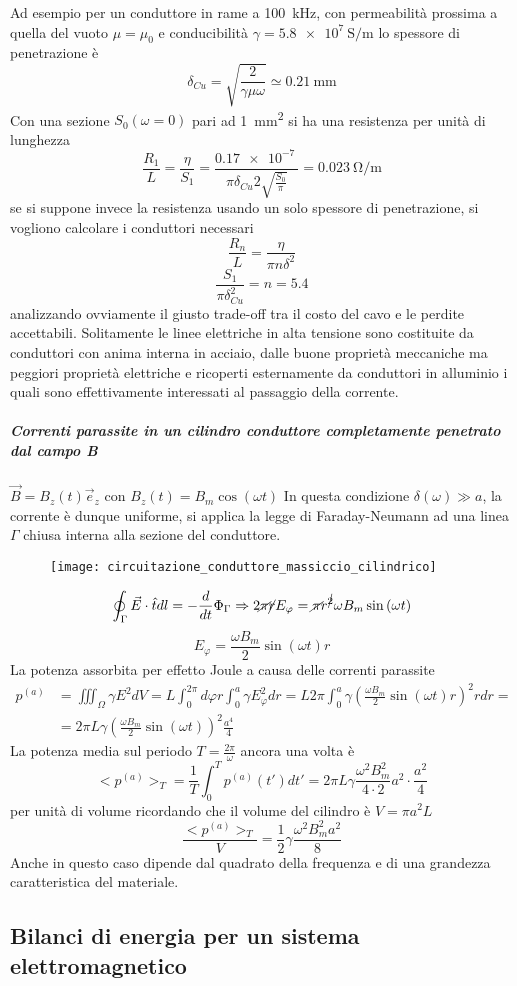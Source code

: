 Ad esempio per un conduttore in rame a \SI{100}{\kilo\hertz}, con permeabilità prossima a quella del vuoto
$\mu = \mu_0 $ e conducibilità $\gamma= \SI{5.8e7}{\siemens\per\meter}$ lo spessore di penetrazione è
$$
\delta_{Cu} = \sqrt{\frac{2}{\gamma\mu\omega}} \simeq \SI{0.21}{\milli\meter}
$$
Con una sezione $S_0(\omega = 0)$ pari ad \SI{1}{\milli\meter^2} si ha una resistenza per unità di lunghezza
$$
\frac{R_1}{L} = \frac{\eta}{S_1} = \frac{\SI{0.17e-7}{}}{\pi\delta_{Cu} 2\sqrt{\frac{S_0}{\pi}}} = \SI{0.023}{\ohm\per\meter}
$$
se si suppone invece la resistenza usando un solo spessore di penetrazione, si vogliono calcolare i conduttori
necessari
$$
\frac{R_n}{L} = \frac{\eta}{\pi n\delta^2}
$$
$$
\frac{S_1}{\pi\delta_{Cu}^2} = n = 5.4
$$
analizzando ovviamente il giusto trade-off tra il costo del cavo e le perdite accettabili. Solitamente le linee 
elettriche in alta tensione sono costituite da conduttori con anima interna in acciaio, dalle buone proprietà
meccaniche ma peggiori proprietà elettriche e ricoperti esternamente da conduttori in alluminio i quali sono
effettivamente interessati al passaggio della corrente.

\subparagraph{Correnti parassite in un cilindro conduttore completamente penetrato dal campo B} $\vec{B} = B_z(t)\vec{e}_z$ con $B_z(t) = B_m\cos\left(\omega t\right)$
In questa condizione $\delta(\omega)\gg a$, la corrente è dunque uniforme, si applica la legge di Faraday-Neumann
ad una linea $\Gamma$ chiusa interna alla sezione del conduttore.
\begin{figure}[H]
\centering
\texttt{[image: circuitazione\_conduttore\_massiccio\_cilindrico]}
\end{figure}
$$
\oint_\Gamma \vec{E}\cdot\hat{t}dl = - \frac{d}{dt}\Phi_\Gamma \Rightarrow 2\cancel{\pi} \cancel{r} E_\varphi = \cancel{\pi} r^{\cancel{2}} \omega B_m\sin\left(\omega t\right)
$$
$$
E_\varphi = \frac{\omega B_m}{2}\sin\left(\omega t\right)r
$$
La potenza assorbita per effetto Joule a causa delle correnti parassite
$$\begin{aligned}
p^{(a)} &= \iiint_\Omega \gamma E^2 dV = L\int_0^{2\pi}d\varphi r \int_0^a\gamma E^2_\varphi dr = L2\pi \int_0^a \gamma \left(\frac{\omega B_m}{2}\sin\left(\omega t\right)r\right)^2rdr =\\
&= 2\pi L \gamma \left(\frac{\omega B_m}{2}\sin\left(\omega t\right)\right)^2\frac{a^4}{4} 
\end{aligned}
$$
La potenza media sul periodo $T = \frac{2\pi}{\omega}$ ancora una volta è
$$
<p^{(a)}>_T = \frac{1}{T} \int_0^T p^{(a)}(t')dt' = 2\pi L\gamma \frac{\omega^2B_m^2}{4\cdot 2} a^2 \cdot \frac{a^2}{4}
$$
per unità di volume ricordando che il volume del cilindro è $V = \pi a^2 L $
$$
\frac{<p^{(a)}>_T }{V} = \frac{1}{2}\gamma\frac{\omega^2B_m^2a^2}{8}
$$
Anche in questo caso dipende dal quadrato della frequenza e di una grandezza caratteristica del materiale.
\newpage
\subsection{Bilanci di energia per un sistema elettromagnetico}
